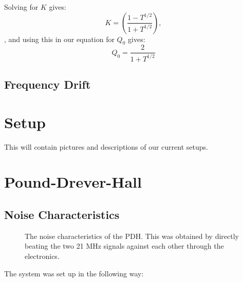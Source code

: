 \documentclass[reprint]{revtex4-1}
\begin{document}
Solving for $K$ gives:
\[
K = \left( \frac{1-T^{1/2}}{1+T^{1/2}}\right),
\],
and using this in our equation for $Q_0$ gives:
\begin{equation}
\label{eq:qnought}
Q_0 = \frac{2}{1+T^{1/2}}
\end{equation}
\subsection*{Frequency Drift}

\section*{Setup}
This will contain pictures and descriptions of our current 
setups.
\section*{Pound-Drever-Hall}
\subsection*{Noise Characteristics}
\begin{figure}[H]
\caption{The noise characteristics of the PDH. This was obtained by directly beating the
two 21 MHz signals against each other through the electronics.}
\end{figure}
The system was set up in the following way:


\end{document}
